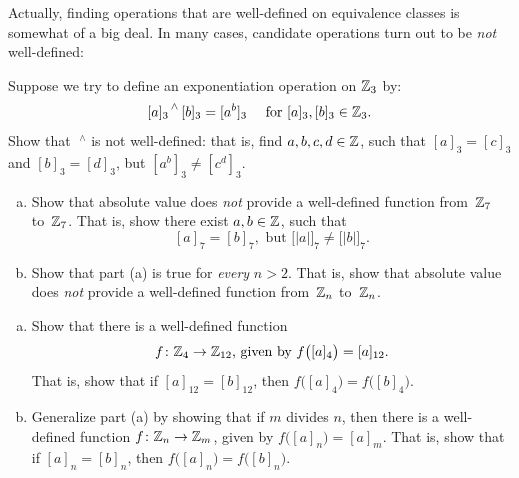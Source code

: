 Actually, finding operations that are well-defined on equivalence classes is somewhat of a big deal. In many cases, candidate operations turn out to be \emph{not} well-defined:

\begin{exercise}\label{exercise:EquivalenceRelationsChap:ExpModNotWellDef}
Suppose we try to define an exponentiation operation on $\mathbb{Z}_3$ by:
\[
 {[a]_3}^{\,\wedge} \, [b]_3 = [a^b]_3 \quad \text{ for } [a]_3, [b]_3 \in \mathbb{Z}_3. \]
Show that $\;^{\wedge}$ is not well-defined: that is, find $a, b, c, d \in \mathbb{Z}$, such that $[a]_3 = [c]_3$ and $[b]_3 = [d]_3$, but $\left[a^b \right]_3 \neq \left[c^d \right]_3$.
\end{exercise}

\begin{exercise}\label{exercise:EquivalenceRelationsChap:WellDefEx}
\begin{enumerate}[(a)]
\item  \label{WellDefEx-AbsVal0}
 Show that absolute value does \emph{not} provide a well-defined function from~$\mathbb{Z}_7$ to~$\mathbb{Z}_7$. That is, show there exist $a,b \in \mathbb{Z}$, such that $$[a]_7 = [b]_7, \text{ but } \bigl[ |a| \bigr]_7 \neq \bigl[ |b| \bigr]_7.$$
\item  \label{WellDefEx-AbsVal}
 Show that part (a) is true for \emph{every} $n > 2$. That is, show that  absolute value does \emph{not} provide a well-defined function from~$\mathbb{Z}_n$ to~$\mathbb{Z}_n$. 
\end{enumerate}
\end{exercise}

\begin{exercise}\label{exercise:EquivalenceRelationsChap:57}
\begin{enumerate}[(a)]
\item
Show that there is a well-defined function 
	$$ \text{$f \colon \mathbb{Z}_4 \to \mathbb{Z}_{12}$, given by $f \bigl( [a]_4 \bigr) = [a]_{12}$.} $$
That is, show that if $[a]_{12} = [b]_{12}$, then $f \bigl( [a]_4 \bigr) = f \bigl( [b]_4 \bigr)$.
\item  \label{WellDefEx-divide}
Generalize part (a) by showing that if $m$ divides $n$, then there is a well-defined function 
$f \colon \mathbb{Z}_n \to \mathbb{Z}_m$, given by $f \bigl( [a]_n \bigr) = [a]_m$.
That is, show that if $[a]_n = [b]_n$, then $f \bigl( [a]_n \bigr) = f \bigl( [b]_n \bigr)$.
\end{enumerate}
\end{exercise}

